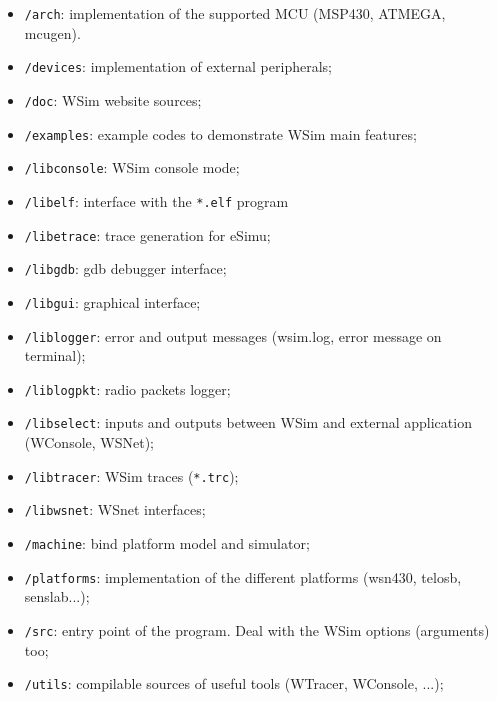\documentclass[a4paper,10pt]{report}
\begin{document}
\begin{itemize}
  \item \verb$/arch$: implementation of the supported MCU (MSP430, ATMEGA, mcugen).

  \item \verb$/devices$: implementation of external peripherals;

  \item \verb$/doc$: WSim website sources;

  \item \verb$/examples$: example codes to demonstrate WSim main features;

  \item \verb$/libconsole$: WSim console mode;

  \item \verb$/libelf$: interface with the \verb$*.elf$ program

  \item \verb$/libetrace$: trace generation for eSimu;

  \item \verb$/libgdb$: gdb debugger interface;

  \item \verb$/libgui$: graphical interface;

  \item \verb$/liblogger$: error and output messages (wsim.log, error message on terminal);
  
  \item \verb$/liblogpkt$: radio packets logger;

  \item \verb$/libselect$: inputs and outputs between WSim and external application (WConsole, WSNet);

  \item \verb$/libtracer$: WSim traces (\verb$*.trc$);

  \item \verb$/libwsnet$: WSnet interfaces;

  \item \verb$/machine$: bind platform model and simulator;

  \item \verb$/platforms$: implementation of the different platforms (wsn430, telosb, senslab...);

  \item \verb$/src$: entry point  of the program. Deal with the WSim options (arguments) too;

  \item \verb$/utils$: compilable sources of useful tools (WTracer, WConsole, ...);
\end{itemize}
\end{document}
